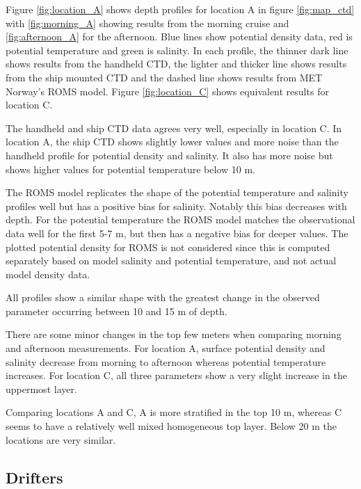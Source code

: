 \documentclass[a4paper,10pt,english]{article}
\begin{document}
\newpage
Figure \ref*{fig:location_A} shows depth profiles for location A in figure \ref*{fig:map_ctd} with \ref*{fig:morning_A} showing results from the morning cruise and \ref*{fig:afternoon_A} for the afternoon. Blue lines show potential density data, red is potential temperature and green is salinity. In each profile, the thinner dark line shows results from the handheld CTD, the lighter and thicker line shows results from the ship mounted CTD and the dashed line shows results from MET Norway's ROMS model. Figure \ref*{fig:location_C} shows equivalent results for location C.

The handheld and ship CTD data agrees very well, especially in location C. In location A, the ship CTD shows slightly lower values and more noise than the handheld profile for potential density and salinity. It also has more noise but shows higher values for potential temperature below 10 m. 

The ROMS model replicates the shape of the potential temperature and salinity profiles well but has a positive bias for salinity. Notably this bias decreases with depth. For the potential temperature the ROMS model matches the observational data well for the first 5-7 m, but then has a negative bias for deeper values. The plotted potential density for ROMS is not considered since this is computed separately based on model salinity and potential temperature, and not actual model density data.

All profiles show a similar shape with the greatest change in the observed parameter occurring between 10 and 15 m of depth.

There are some minor changes in the top few meters when comparing morning and afternoon measurements. For location A, surface potential density and salinity decrease from morning to afternoon whereas potential temperature increases. For location C, all three parameters show a very slight increase in the uppermost layer.

Comparing locations A and C, A is more stratified in the top 10 m, whereas C seems to have a relatively well mixed homogeneous top layer. Below 20 m the locations are very similar.

\subsection{Drifters}
\end{document}
